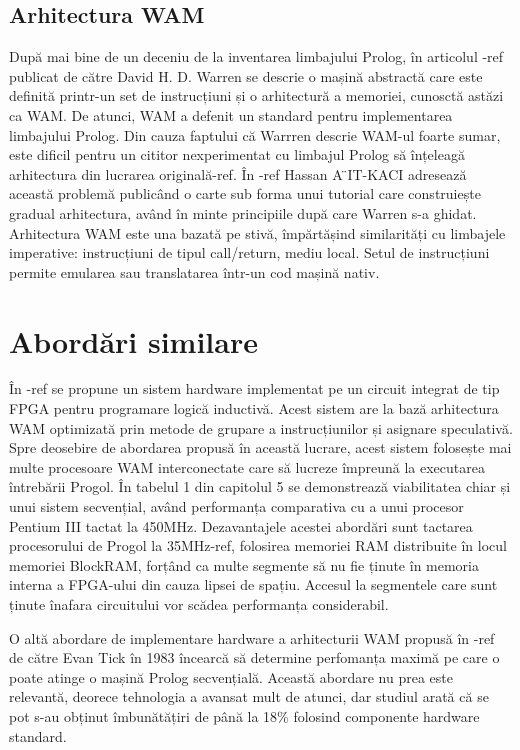 \documentclass[12pt,a4paper,twoside]{report}
\begin{document}
\subsection{Arhitectura WAM}
După mai bine de un deceniu de la inventarea limbajului Prolog, în articolul -ref publicat de către David H. D. Warren se descrie o mașină abstractă care este definită printr-un set de instrucțiuni și o arhitectură a memoriei, cunosctă astăzi ca WAM. De atunci, WAM a defenit un standard pentru implementarea limbajului Prolog. Din cauza faptului că Warrren descrie WAM-ul foarte sumar, este dificil pentru un cititor nexperimentat cu limbajul Prolog să înțeleagă arhitectura din lucrarea originală-ref. În -ref Hassan A ̈IT-KACI adresează această problemă publicând o carte sub forma unui tutorial care construiește gradual arhitectura, având în minte principiile după care Warren s-a ghidat.
Arhitectura WAM este una bazată pe stivă, împărtășind similarități cu limbajele imperative: instrucțiuni de tipul call/return, mediu local. Setul de instrucțiuni permite emularea sau translatarea într-un cod mașină nativ.
\section{Abordări similare}
În -ref se propune un sistem hardware implementat pe un circuit integrat de tip FPGA pentru programare logică inductivă. Acest sistem are la bază arhitectura WAM optimizată prin metode de grupare a instrucțiunilor și asignare speculativă. Spre deosebire de abordarea propusă în această lucrare, acest sistem folosește mai multe procesoare WAM interconectate care să lucreze împreună la executarea întrebării Progol. În tabelul 1 din capitolul 5 se demonstrează viabilitatea chiar și unui sistem secvențial, având performanța comparativa cu a unui procesor Pentium III tactat la 450MHz. Dezavantajele acestei abordări sunt tactarea procesorului de Progol la 35MHz-ref, folosirea memoriei RAM distribuite în locul memoriei BlockRAM, forțând ca multe segmente să nu fie ținute în memoria interna a FPGA-ului din cauza lipsei de spațiu. Accesul la segmentele care sunt ținute înafara circuitului vor scădea performanța considerabil.

O altă abordare de implementare hardware a arhitecturii WAM propusă în -ref de către Evan Tick în 1983 încearcă să determine perfomanța maximă pe care o poate atinge o mașină Prolog secvențială. Această abordare nu prea este relevantă, deorece tehnologia a avansat mult de atunci, dar studiul arată că se pot s-au obținut îmbunătățiri de până la 18\% folosind componente hardware standard.
\end{document}
